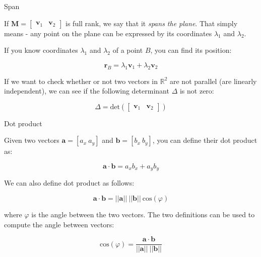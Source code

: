 \documentclass{beamer}
\begin{document}
\begin{frame}{Span}
	\begin{flushleft}
		
		If  $\mathbf M = \begin{bmatrix}
			\mathbf v_1 & \mathbf v_2
		\end{bmatrix}$ is full rank, we say that it \emph{spans the plane}. That simply means - any point on the plane can be expressed by its coordinates $\lambda_1$ and $\lambda_2$.
		
		\bigskip	
		
		If you know coordinates $\lambda_1$ and $\lambda_2$ of a point $B$, you can find its position:
		
	\begin{equation}
		\mathbf r_B
		=
	\lambda_1 \mathbf v_1 + \lambda_2 \mathbf v_2
\end{equation}	


If we want to check whether or not  two vectors in $\mathbb{R}^2$ are not parallel (are linearly independent), we can see if the following determinant $\Delta$ is not zero:

	\begin{equation}
		\Delta = 
		\text{det}\left(
		\begin{bmatrix}
			\mathbf v_1 & \mathbf v_2
		\end{bmatrix}\right)
\end{equation}	

		
	\end{flushleft}
\end{frame}





\begin{frame}{Dot product}
	\begin{flushleft}
		
		Given two vectors $\mathbf a = [a_x \ a_y]$ and $\mathbf b = [b_x \ b_y]$, you can define their dot product as:
		
			\begin{equation}
			\mathbf a \cdot \mathbf b = a_x b_x + a_y b_y
		\end{equation}	
	
	\bigskip
		
		We can also define dot product as follows: 
		
		\begin{equation}
			\mathbf a \cdot \mathbf b = 
			||\mathbf a|| \ ||\mathbf b|| \ \text{cos}(\varphi)
		\end{equation}	

	where $\varphi$ is the angle between the two vectors. The two definitions can be used to compute the angle between vectors:
	
		\begin{equation}
			\text{cos}(\varphi) = 
			\frac{\mathbf a \cdot \mathbf b}{||\mathbf a|| \ ||\mathbf b||}
		\end{equation}	
		
	\end{flushleft}
\end{frame}
\end{document}
